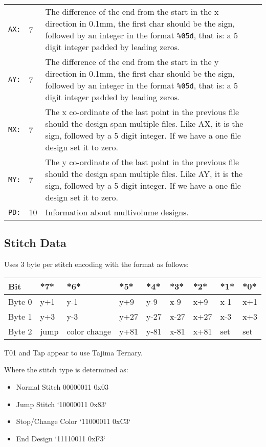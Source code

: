 \begin{longtable}{l l p{8cm} l}
\texttt{AX:} & 7 & The difference of the end from the start in the x direction in 0.1mm, the first char should be the sign, followed by an integer in the format \texttt{\%05d}, that is: a 5 digit integer padded by leading zeros. \\
\texttt{AY:} & 7 & The difference of the end from the start in the y direction in 0.1mm, the first char should be the sign, followed by an integer in the format \texttt{\%05d}, that is: a 5 digit integer padded by leading zeros. \\
\texttt{MX:} & 7 & The x co-ordinate of the last point in the previous file should the design span multiple files. Like AX, it is the sign, followed by a 5 digit integer. If we have a one file design set it to zero. \\
\texttt{MY:} & 7 & The y co-ordinate of the last point in the previous file should the design span multiple files. Like AY, it is the sign, followed by a 5 digit integer. If we have a one file design set it to zero. \\
\texttt{PD:} & 10 & Information about multivolume designs.
\end{longtable}

\subsection{Stitch Data}

Uses 3 byte per stitch encoding with the format as follows:

\begin{tabular}{l l l l l l l l l}
\textbf{Bit} & *7* & *6* & *5* & *4* & *3* & *2* & *1* & *0* \\
\hline
Byte 0 & y+1 & y-1 & y+9 & y-9 & x-9 & x+9 & x-1 & x+1 \\
Byte 1 & y+3 & y-3 & y+27 & y-27 & x-27 & x+27 & x-3 & x+3 \\
Byte 2 & jump & color change & y+81 & y-81 & x-81 & x+81 & set & set
\end{tabular}

T01 and Tap appear to use Tajima Ternary.
 
Where the stitch type is determined as:

\begin{itemize}
\item Normal Stitch 00000011 0x03
\item Jump Stitch `10000011 0x83`
\item Stop/Change Color `11000011 0xC3`
\item End Design `11110011 0xF3`
\end{itemize}


